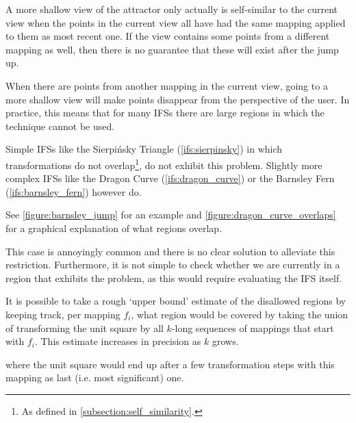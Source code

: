 \documentclass[11pt]{article}
\begin{document}
\begin{enumerate}
A more shallow view of the attractor only actually is self-similar to the current view when
the points in the current view all have had the same mapping applied to them as most recent one.
If the view contains some points from a different mapping as well, 
then there is no guarantee that these will exist after the jump up.

When there are points from another mapping in the current view, 
going to a more shallow view will make points disappear from the perspective of the user.
In practice, this means that for many IFSs there are large regions in which the technique cannot be used.

Simple IFSs like the Sierpińsky Triangle (\autoref{ifs:sierpinsky}) in which transformations
do not overlap\footnote{As defined in \autoref{subsection:self_similarity}.}, do not exhibit this problem. 
Slightly more complex IFSs like the Dragon Curve (\autoref{ifs:dragon_curve}) or the Barnsley Fern (\autoref{ifs:barnsley_fern}) however do.

See \autoref{figure:barnsley_jump} for an example 
and \autoref{figure:dragon_curve_overlaps} for a graphical explanation of what regions overlap.


This case is annoyingly common and there is no clear solution to alleviate this restriction.
Furthermore, it is not simple to check whether we are currently in a region that exhibits the problem,
as this would require evaluating the IFS itself.

It is possible to take a rough `upper bound' estimate of the disallowed regions by keeping track, 
per mapping \(f_i\), what region would be covered by 
taking the union of transforming the unit square by all \(k\)-long sequences of mappings that start with \(f_i\).
This estimate increases in precision as \(k\) grows.

where the unit square would end up after a few transformation steps with this mapping as last (i.e. most significant) one.



\end{enumerate}
\end{document}
